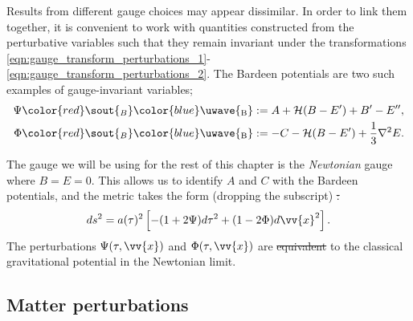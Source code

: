 \documentclass[a4paper,12pt,times,custombib,print,index]{Classes/PhDThesisPSnPDF} %
\providecommand{\DIFadd}[1]{{\protect\color{blue}\uwave{#1}}} %
\providecommand{\DIFdel}[1]{{\protect\color{red}\sout{#1}}}                      %
\providecommand{\DIFaddbegin}{} %
\providecommand{\DIFaddend}{} %
\providecommand{\DIFdelbegin}{} %
\providecommand{\DIFdelend}{} %
\newcommand{\DIFscaledelfig}{0.5}
\newlength{\DIFdelgraphicswidth} %
\newlength{\DIFdelgraphicsheight} %
\newcommand{\DIFaddincludegraphics}[2][]{{\color{blue}\fbox{\DIFOincludegraphics[#1]{#2}}}} %
\newcommand{\DIFdelincludegraphics}[2][]{%
\sbox{\DIFdelgraphicsbox}{\DIFOincludegraphics[#1]{#2}}%
\settoboxwidth{\DIFdelgraphicswidth}{\DIFdelgraphicsbox} %
\settoboxtotalheight{\DIFdelgraphicsheight}{\DIFdelgraphicsbox} %
\scalebox{\DIFscaledelfig}{%
\parbox[b]{\DIFdelgraphicswidth}{\usebox{\DIFdelgraphicsbox}\\[-\baselineskip] \rule{\DIFdelgraphicswidth}{0em}}\llap{\resizebox{\DIFdelgraphicswidth}{\DIFdelgraphicsheight}{%
\setlength{\unitlength}{\DIFdelgraphicswidth}%
\begin{picture}(1,1)%
\thicklines\linethickness{2pt} %
{\color[rgb]{1,0,0}\put(0,0){\framebox(1,1){}}}%
{\color[rgb]{1,0,0}\put(0,0){\line( 1,1){1}}}%
{\color[rgb]{1,0,0}\put(0,1){\line(1,-1){1}}}%
\end{picture}%
}\hspace*{3pt}}} %
} %
\DeclareRobustCommand{\DIFaddbegin}{\DIFOaddbegin \let\includegraphics\DIFaddincludegraphics} %
\DeclareRobustCommand{\DIFaddend}{\DIFOaddend \let\includegraphics\DIFOincludegraphics} %
\DeclareRobustCommand{\DIFdelbegin}{\DIFOdelbegin \let\includegraphics\DIFdelincludegraphics} %
\DeclareRobustCommand{\DIFdelend}{\DIFOaddend \let\includegraphics\DIFOincludegraphics} %
\begin{document}
Results from different gauge choices may appear dissimilar. In order to link them together, it is convenient to work with quantities constructed from the perturbative variables such that they remain invariant under the transformations \eqref{eqn:gauge_transform_perturbations_1}-\eqref{eqn:gauge_transform_perturbations_2}. The Bardeen potentials are two such examples of gauge-invariant variables;
\begin{align}
	\Psi\DIFdelbegin \DIFdel{_B }\DIFdelend \DIFaddbegin \DIFadd{_\textrm{B} }\DIFaddend &:= A + \mathcal{H}(B-E') + B' - E'', \\
	\Phi\DIFdelbegin \DIFdel{_B }\DIFdelend \DIFaddbegin \DIFadd{_\textrm{B} }\DIFaddend &:= -C - \mathcal{H}(B-E') + \frac{1}{3}\nabla^2 E.
\end{align}

The gauge we will be using for the rest of this chapter is the \textit{Newtonian} gauge where $B=E=0$. This allows us to identify $A$ and $C$ with the Bardeen potentials, and the metric takes the form (dropping the subscript)
\DIFdelbegin \DIFdel{:
}\DIFdelend \begin{align}
	ds^2 = a(\tau)^2 \left[ -(1 + 2\Psi) d\tau^2 + (1-2\Phi) d\vv{x}^2  \right]. \label{eqn:perturbed_metric_newtonian_gauge}
\end{align}
The perturbations $\Psi(\tau,\vv{x})$ and $\Phi(\tau,\vv{x})$ are \DIFdelbegin \DIFdel{equivalent }\DIFdelend \DIFaddbegin \DIFadd{directly related }\DIFaddend to the classical gravitational potential in the Newtonian limit.


\subsection{Matter perturbations}
\end{document}

